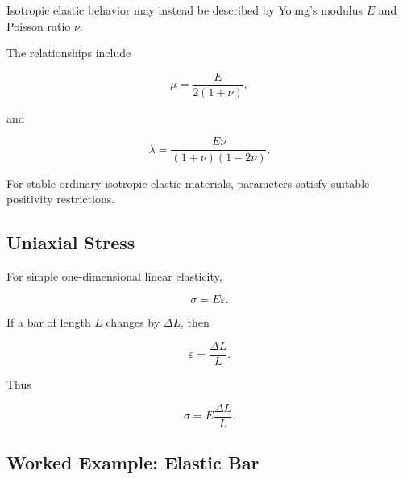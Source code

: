Isotropic elastic behavior may instead be described by Young's modulus \(E\)
and Poisson ratio \(\nu\).

The relationships include

\[
\boxed{
\mu
=
\frac{E}
{2(1+\nu)},
}
\]

and

\[
\boxed{
\lambda
=
\frac{E\nu}
{(1+\nu)(1-2\nu)}.
}
\]

For stable ordinary isotropic elastic materials, parameters satisfy suitable
positivity restrictions.

\subsection{Uniaxial Stress}
\label{subsec:uniaxial-stress}

For simple one-dimensional linear elasticity,

\[
\boxed{
\sigma
=
E\varepsilon.
}
\]

If a bar of length \(L\) changes by \(\Delta L\), then

\[
\boxed{
\varepsilon
=
\frac{\Delta L}{L}.
}
\]

Thus

\[
\boxed{
\sigma
=
E\frac{\Delta L}{L}.
}
\]

\subsection{Worked Example: Elastic Bar}
\label{subsec:worked-elastic-bar}


